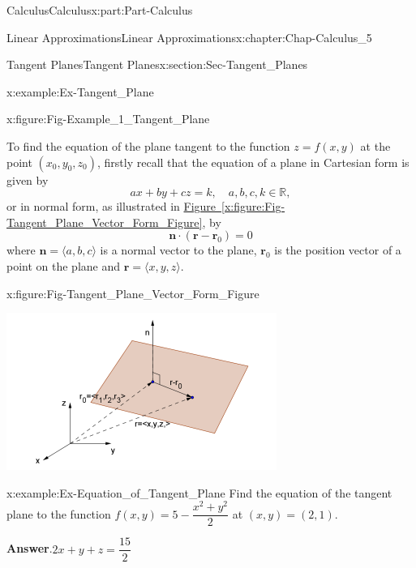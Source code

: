 \documentclass[oneside,10pt,]{book}
\newcommand{\blocktitlefont}{\relax}
\newcommand{\xreffont}{\relax}
\numberwithin{equation}{section}
\newcommand{\bm}[1]{\boldsymbol{#1}}
\begin{document}
\begin{partptx}{Calculus}{}{Calculus}{}{}{x:part:Part-Calculus}
\begin{chapterptx}{Linear Approximations}{}{Linear Approximations}{}{}{x:chapter:Chap-Calculus_5}
\begin{sectionptx}{Tangent Planes}{}{Tangent Planes}{}{}{x:section:Sec-Tangent_Planes}
\begin{example}{}{x:example:Ex-Tangent_Plane}
\begin{figureptx}{}{x:figure:Fig-Example_1_Tangent_Plane}{}
\begin{image}{0.15}{0.7}{0.15}
\end{image}%
\tcblower
\end{figureptx}%
\end{example}
To find the equation of the plane tangent to the function \(z=f(x,y)\) at the point \((x_0,y_0,z_0)\), firstly recall that the equation of a plane in Cartesian form is given by%
\begin{equation*}
ax+by+cz = k, \quad a,b,c,k \in \mathbb{R},
\end{equation*}
or in normal form, as illustrated in \hyperref[x:figure:Fig-Tangent_Plane_Vector_Form_Figure]{Figure~{\xreffont\ref{x:figure:Fig-Tangent_Plane_Vector_Form_Figure}}}, by%
\begin{equation}
\bm{n} \cdot (\bm{r}-\bm{r}_0) = 0\label{x:men:Eqn-Tangent_Plane_Vector_Form}
\end{equation}
where \(\bm{n} = \langle a,b,c \rangle\) is a normal vector to the plane, \(\bm{r}_0\) is the position vector of a point on the plane and \(\bm{r} = \langle x,y,z \rangle\).%
\begin{figureptx}{}{x:figure:Fig-Tangent_Plane_Vector_Form_Figure}{}%
\begin{image}{0.15}{0.7}{0.15}%
\includegraphics[width=\linewidth]{./Calculus/Images/5/Tangent_Plane_Vector_Form.png}
\end{image}%
\tcblower
\end{figureptx}%
\begin{example}{}{x:example:Ex-Equation_of_Tangent_Plane}%
Find the equation of the tangent plane to the function \(f(x,y) = 5-\dfrac{x^2+y^2}{2}\) at \((x,y) = (2,1)\).%
\par\smallskip%
\noindent\textbf{\blocktitlefont Answer}.\hypertarget{g:answer:id548430}{}\quad{}\(2x+y+z=\dfrac{15}{2}\)%
\par\smallskip%

\end{example}
\end{sectionptx}
\end{chapterptx}
\end{partptx}
\end{document}
